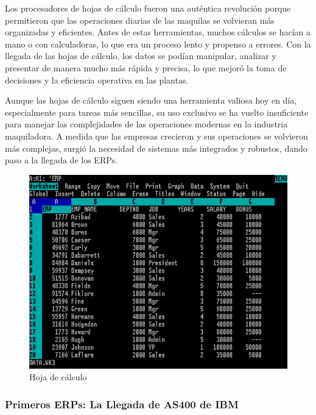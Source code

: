 \documentclass[
  10pt,
  letterpaper,
]{book}
\begin{document}
Los procesadores de hojas de cálculo fueron una auténtica revolución
porque permitieron que las operaciones diarias de las maquilas se
volvieran más organizadas y eficientes. Antes de estas herramientas,
muchos cálculos se hacían a mano o con calculadoras, lo que era un
proceso lento y propenso a errores. Con la llegada de las hojas de
cálculo, los datos se podían manipular, analizar y presentar de manera
mucho más rápida y precisa, lo que mejoró la toma de decisiones y la
eficiencia operativa en las plantas.

Aunque las hojas de cálculo siguen siendo una herramienta valiosa hoy en
día, especialmente para tareas más sencillas, su uso exclusivo se ha
vuelto insuficiente para manejar las complejidades de las operaciones
modernas en la industria maquiladora. A medida que las empresas
crecieron y sus operaciones se volvieron más complejas, surgió la
necesidad de sistemas más integrados y robustos, dando paso a la llegada
de los ERPs.

\begin{figure}[H]

{\centering \includegraphics{Img/Lotus.png}

}

\caption{Hoja de cálculo}

\end{figure}%

\subsubsection{Primeros ERPs: La Llegada de AS400 de
IBM}\label{primeros-erps-la-llegada-de-as400-de-ibm}
\end{document}
